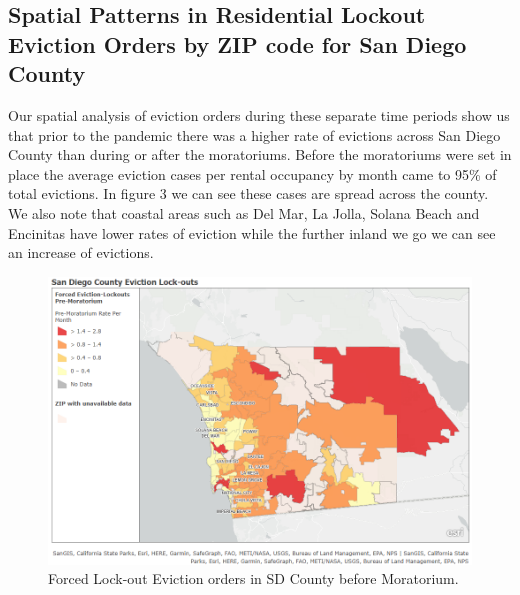 \documentclass[man, 12pt, donotrepeattitle, floatsintext]{apa7} %
\begin{document}
\subsection{Spatial Patterns in Residential Lockout Eviction Orders by ZIP code for San Diego County}

Our spatial analysis of eviction orders during these separate time periods show us that prior to the pandemic there was a higher rate of evictions across San Diego County than during or after the moratoriums. Before the moratoriums were set in place the average eviction cases per rental occupancy by month came to 95\% of total evictions. In figure 3 we can see these cases are spread across the county. We also note that coastal areas such as Del Mar, La Jolla, Solana Beach and Encinitas have lower rates of eviction while the further inland we go we can see an increase of evictions. 


\begin{figure}[H]
  \includegraphics[width=\linewidth]{figures/gis_pre_figure1.png}
  \caption{Forced Lock-out Eviction orders in SD County before Moratorium.}
  \label{fig:ForcedEviction_BEFORE_fig1}
\end{figure}
\end{document}
